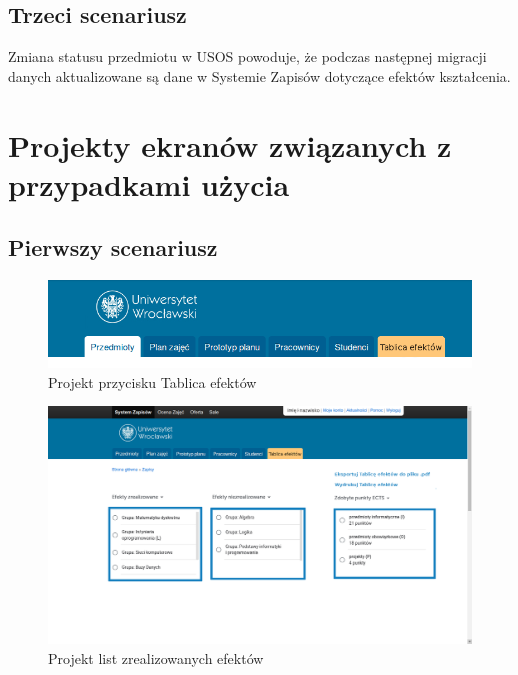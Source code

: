 \documentclass{article}
\begin{document}
\subsection{Trzeci scenariusz}
Zmiana statusu przedmiotu w USOS powoduje, że podczas następnej migracji danych aktualizowane są dane w Systemie Zapisów dotyczące efektów kształcenia.


\afterpage{\null\newpage}
\newpage


\section{Projekty ekranów związanych z przypadkami użycia}
\subsection{Pierwszy scenariusz}
\begin{figure}[H]
	\begin{center}
		\includegraphics[scale=0.45]{te.png}
		\caption{Projekt przycisku Tablica efektów}
	\end{center}
\end{figure}

\begin{figure}[H]
	\begin{center}
		\includegraphics[scale=0.23]{tabl.png}
		\caption{Projekt list zrealizowanych efektów}
	\end{center}
\end{figure}
\end{document}

